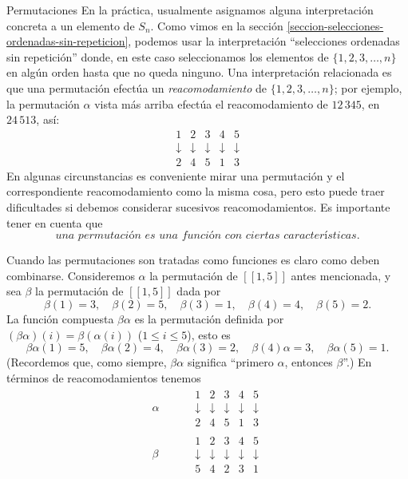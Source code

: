 \begin{section}{Permutaciones}
En la práctica, usualmente asignamos alguna interpretación concreta a un elemento de $S_n$. Como vimos en la sección \ref{seccion-selecciones-ordenadas-sin-repeticion}, podemos usar la interpretación ``selecciones ordenadas sin repetición''   donde, en este caso seleccionamos los elementos de $\{1,2,3,\ldots,n\}$ en algún orden hasta que no queda ninguno. Una interpretación relacionada es que una permutación efectúa un \textit{reacomodamiento} de $\{1,2,3,\ldots,n\}$; por ejemplo, la permutación $\alpha$ vista más arriba  efectúa el reacomodamiento de $12\,345$, en $24\,513$, así:
$$
\begin{matrix} 1&2&3&4&5 \\
\downarrow&\downarrow&\downarrow&\downarrow&\downarrow\\2 &4 &5 &1
& 3
\end{matrix}
$$
En algunas circunstancias es conveniente mirar una permutación y el correspondiente reacomodamiento como la misma cosa, pero esto puede traer dificultades si debemos considerar sucesivos reacomodamientos. Es importante tener en cuenta que 
$$
\textit{una permutación es una función con ciertas características.}
$$

Cuando las permutaciones son tratadas como funciones es claro como deben combinarse. Consideremos $\alpha$ la permutación de $[[1,5]]$ antes mencionada, y sea $\beta$ la permutación de $[[1,5]]$ dada por 
$$
\beta(1)=3,\quad \beta(2)=5,\quad \beta(3)=1,\quad
\beta(4)=4,\quad \beta(5)=2.
$$
La función compuesta $\beta\alpha$ es la permutación definida por $(\beta\alpha)(i)= \beta(\alpha(i))$ ($1\le i\le 5$), esto es 
$$
\beta\alpha(1)=5,\quad \beta\alpha(2)=4,\quad
\beta\alpha(3)=2,\quad \beta(4)\alpha=3,\quad \beta\alpha(5)=1.
$$
(Recordemos que, como siempre, $\beta\alpha$ significa ``primero $\alpha$, entonces $\beta$''.) En términos de reacomodamientos tenemos
$$\begin{aligned}
\alpha\quad&\quad\begin{matrix} 1&2&3&4&5 \\
\downarrow&\downarrow&\downarrow&\downarrow&\downarrow\\2 &4 &5 &1
& 3
\end{matrix} \\
\beta \quad&\quad \begin{matrix} 1&2&3&4&5 \\
\downarrow&\downarrow&\downarrow&\downarrow&\downarrow\\5 &4 &2 &3
& 1
\end{matrix}
 \end{aligned}
$$




\end{section}
